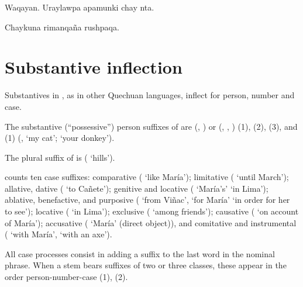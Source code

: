 {%
{Waqayan. Uraylawpa apamunki chay nta.}%
{}%
{}{}%

%
{Chaykuna rimanqa\~na rushpaqa.}%
{}%
{}{}%

\section{Substantive inflection}
Substantives in \SYQ{}, as in other Quechuan languages, inflect for person, number and case.

The substantive (``possessive'') person suffixes of \SYQ{} are  (\AMV, \LT) or \phono{-:} (\ACH{}, \CH{}, \SP{}) (1),  (2),  (3), and  (1) (,  `my cat';  `your donkey').

The plural suffix of \SYQ{} is  ( `hills').

\SYQ{} counts ten case suffixes: comparative  ( `like Mar\'ia'); limitative  ( `until March'); allative, dative  ( `to Ca\~nete'); genitive and locative  ( `Mar\'ia's'  `in Lima'); ablative, benefactive, and purposive  ( `from Vi\~nac',  `for Mar\'ia'  `in order for her to see'); locative  ( `in Lima'); exclusive  ( `among friends'); causative  ( `on account of Mar\'ia'); accusative  ( `Mar\'ia' (direct object)), and comitative and instrumental  ( `with Mar\'ia',  `with an axe').

All case processes consist in adding a suffix to the last word in the nominal phrase. When a stem bears suffixes of two or three classes, these appear in the order person-number-case (1), (2).

}
